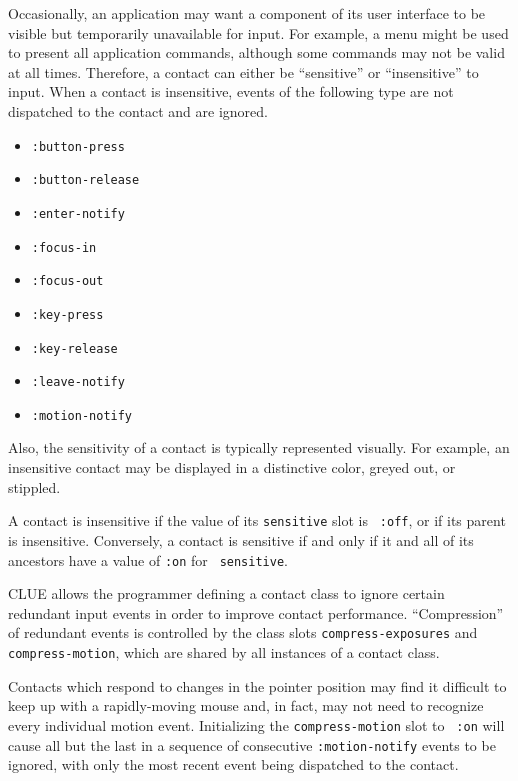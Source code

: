 \documentclass[twoside]{book}
\begin{document}
\begin{sloppy}
Occasionally, an application may want a component of its user interface to be
visible but temporarily unavailable for input. For example, a menu might be used
to present all application commands, although some commands may
not be valid at all times.
Therefore, a contact can either be ``sensitive'' or ``insensitive'' to input.
When a contact is insensitive, events of the following type are not dispatched
to the contact and are ignored.
\begin{itemize}
\item {\tt :button-press}
\item {\tt :button-release}
\item {\tt :enter-notify}
\item {\tt :focus-in}
\item {\tt :focus-out}
\item {\tt :key-press}
\item {\tt :key-release}
\item {\tt :leave-notify}
\item {\tt :motion-notify}
\end{itemize}
Also, the sensitivity of a contact is typically represented visually. For
example, an insensitive contact may be displayed in a distinctive color, greyed
out, or stippled.

A contact is insensitive if the value of its {\tt sensitive} slot is {\tt
:off}, or if its parent is insensitive. Conversely, a contact is sensitive if and
only if it and all of its ancestors have a   value  of {\tt :on} for {\tt
sensitive}.

CLUE allows the programmer defining a contact class to ignore certain redundant
input events in order to improve contact performance. ``Compression'' of
redundant events is controlled by the class slots {\tt compress-exposures} and
{\tt compress-motion}, which are shared by all instances of a contact class.

Contacts which respond to changes in the pointer position may find it difficult
to keep up with a rapidly-moving mouse and, in fact, may not need to recognize every
individual motion event. Initializing the {\tt compress-motion} slot to {\tt
:on} will cause all but the last in a sequence of consecutive {\tt :motion-notify}
events to be
ignored, with only the most recent event being dispatched to the contact.


\end{sloppy}
\end{document}
